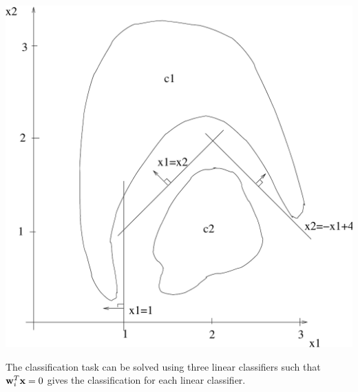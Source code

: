 \begin{enumerate}
\begin{solution}

    \begin{center}
      \includegraphics[scale=0.35]{e61}
    \end{center}

    The classification task can be solved using three linear classifiers
    such that ${\bf{w}}_i^T{\bf{x}}=0$ gives the classification for each
    linear classifier.


\end{solution}
\end{enumerate}
